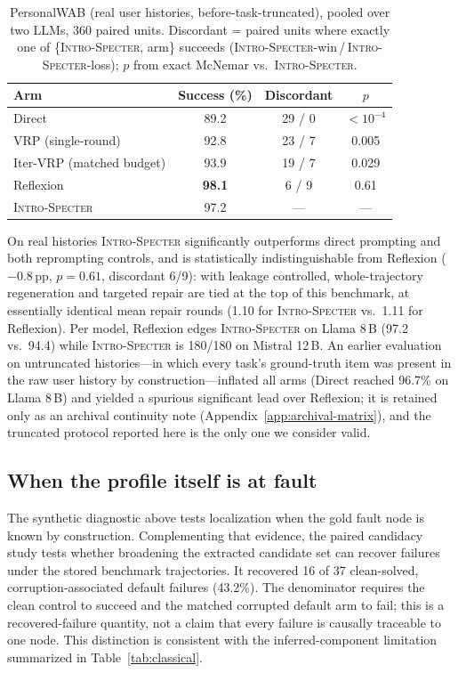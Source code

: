 \documentclass{article}
\newcommand{\method}{\textsc{Intro-Specter}\xspace}
\begin{document}
\begin{table}[t]\centering\small
\caption{PersonalWAB (real user histories, before-task-truncated), pooled over two LLMs, 360 paired units. Discordant = paired units where exactly one of \{\method{}, arm\} succeeds (\method-win\,/\,\method-loss); $p$ from exact McNemar vs.\ \method.}
\label{tab:personalwab}
\begin{tabular}{lccc}\toprule
Arm & Success (\%) & Discordant & $p$ \\\midrule
Direct              & 89.2 & 29 / 0 & $<10^{-4}$ \\
VRP (single-round)  & 92.8 & 23 / 7 & 0.005 \\
Iter-VRP (matched budget) & 93.9 & 19 / 7 & 0.029 \\
Reflexion           & \textbf{98.1} & 6 / 9 & 0.61 \\
\method             & 97.2 & --- & --- \\
\bottomrule\end{tabular}\end{table}

On real histories \method significantly outperforms direct prompting and both reprompting controls, and is statistically indistinguishable from Reflexion ($-0.8$\,pp, $p{=}0.61$, discordant 6/9): with leakage controlled, whole-trajectory regeneration and targeted repair are tied at the top of this benchmark, at essentially identical mean repair rounds (1.10 for \method vs.\ 1.11 for Reflexion). Per model, Reflexion edges \method on Llama 8\,B (97.2 vs.\ 94.4) while \method is 180/180 on Mistral 12\,B. An earlier evaluation on untruncated histories---in which every task's ground-truth item was present in the raw user history by construction---inflated all arms (Direct reached 96.7\% on Llama 8\,B) and yielded a spurious significant lead over Reflexion; it is retained only as an archival continuity note (Appendix~\ref{app:archival-matrix}), and the truncated protocol reported here is the only one we consider valid.

\subsection{When the profile itself is at fault}
The synthetic diagnostic above tests localization when the gold fault node is known by construction. Complementing that evidence, the paired candidacy study tests whether broadening the extracted candidate set can recover failures under the stored benchmark trajectories. It recovered 16 of 37 clean-solved, corruption-associated default failures (43.2\%). The denominator requires the clean control to succeed and the matched corrupted default arm to fail; this is a recovered-failure quantity, not a claim that every failure is causally traceable to one node. This distinction is consistent with the inferred-component limitation summarized in Table~\ref{tab:classical}.
\end{document}
